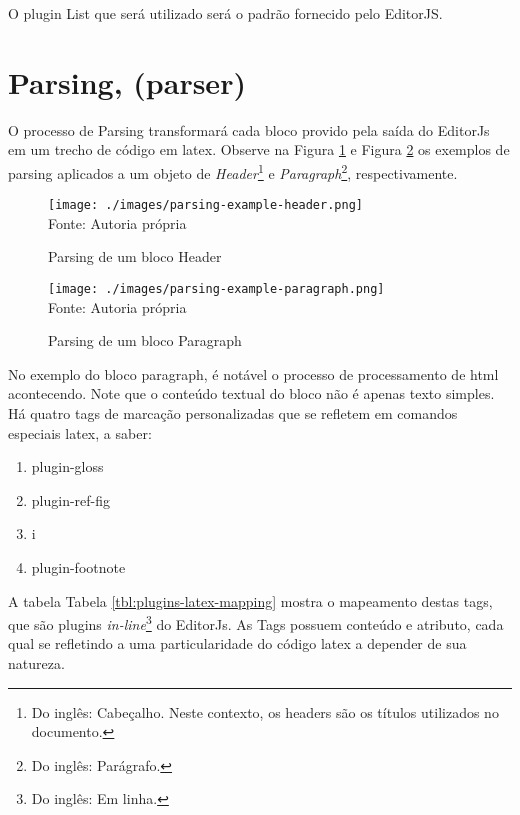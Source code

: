 O plugin List que será utilizado será o padrão fornecido pelo
EditorJS.

\section{Parsing, (parser)}

O processo de Parsing transformará cada bloco provido
pela saída do EditorJs em um trecho de código em
\acrshort{latex}.
Observe na
Figura \ref{fig:parsing-example-header}
e
Figura \ref{fig:parsing-example-paragraph}
os exemplos de parsing aplicados a um objeto de
\textit{Header}\footnote{Do inglês: Cabeçalho. Neste contexto, os headers são os títulos utilizados no documento.
}
e
\textit{Paragraph}\footnote{Do inglês: Parágrafo.
},
respectivamente.

\begin{figure}[H]
    \centering
    \caption{Parsing de um bloco Header}
    \texttt{[image: ./images/parsing-example-header.png]}
    \label{fig:parsing-example-header} \\
    \textnormal{\fontsize{10pt}{12pt}Fonte: Autoria própria}
\end{figure}

\begin{figure}[H]
    \centering
    \caption{Parsing de um bloco Paragraph}
    \texttt{[image: ./images/parsing-example-paragraph.png]}
    \label{fig:parsing-example-paragraph} \\
    \textnormal{\fontsize{10pt}{12pt}Fonte: Autoria própria}
\end{figure}

No exemplo do bloco paragraph, é notável o processo de
processamento de
\acrshort{html}
acontecendo. Note que o conteúdo textual do bloco
não é apenas texto simples. Há quatro tags de
marcação personalizadas que se refletem em comandos
especiais
\acrshort{latex}, a saber:

\begin{enumerate}
        
	\item plugin-gloss
	\item plugin-ref-fig
	\item i
	\item plugin-footnote
    
\end{enumerate}

A tabela
Tabela \ref{tbl:plugins-latex-mapping}
mostra o mapeamento destas tags, que são plugins
\textit{in-line}\footnote{Do inglês: Em linha.
}
do EditorJs. As Tags possuem conteúdo e atributo, cada qual se
refletindo a uma particularidade do código
\acrshort{latex}
a depender de sua natureza.


